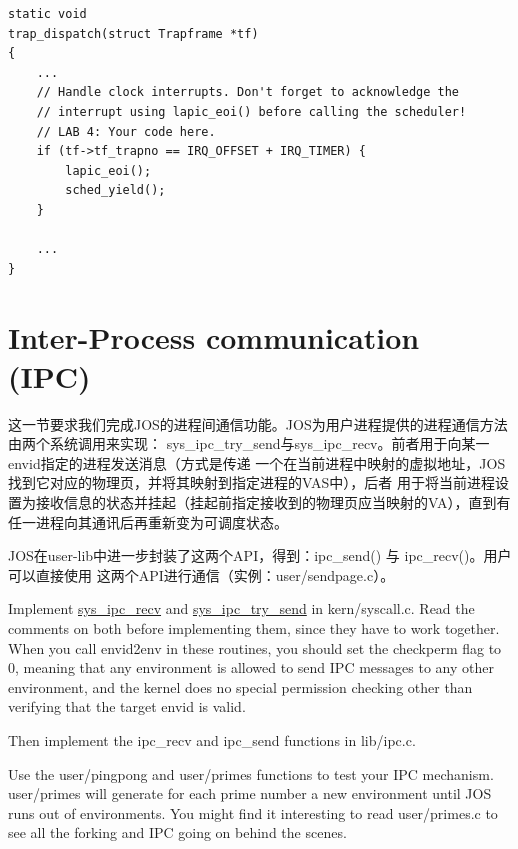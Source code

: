 \documentclass[12pt, letterpaper]{report}
\begin{document}
\lstset{style=CStyle}
\setmainfont{Consolas}
\begin{lstlisting}
static void
trap_dispatch(struct Trapframe *tf)
{
    ...
    // Handle clock interrupts. Don't forget to acknowledge the
    // interrupt using lapic_eoi() before calling the scheduler!
    // LAB 4: Your code here.
    if (tf->tf_trapno == IRQ_OFFSET + IRQ_TIMER) {
        lapic_eoi();
        sched_yield();
    }

    ...
}
\end{lstlisting}
\setmainfont{Times New Roman}

\section[\large Inter-Process communication (IPC)]{Inter-Process communication (IPC)}
这一节要求我们完成JOS的进程间通信功能。JOS为用户进程提供的进程通信方法由两个系统调用来实现：
sys\_ipc\_try\_send与sys\_ipc\_recv。前者用于向某一envid指定的进程发送消息（方式是传递
一个在当前进程中映射的虚拟地址，JOS找到它对应的物理页，并将其映射到指定进程的VAS中），后者
用于将当前进程设置为接收信息的状态并挂起（挂起前指定接收到的物理页应当映射的VA），直到有
任一进程向其通讯后再重新变为可调度状态。\par 
JOS在user-lib中进一步封装了这两个API，得到：ipc\_send() 与 ipc\_recv()。用户可以直接使用
这两个API进行通信（实例：user/sendpage.c）。\par 

\newpage


{
    \par 
    {
        Implement \underline{sys\_ipc\_recv} and \underline{sys\_ipc\_try\_send} in kern/syscall.c. 
        Read the comments on both before implementing them, 
        since they have to work together. 
        When you call envid2env in these routines, 
        you should set the checkperm flag to 0, 
        meaning that any environment is allowed to 
        send IPC messages to any other environment, 
        and the kernel does no special permission 
        checking other than verifying that the target envid is valid.
    }
    \par 
    {
        Then implement the ipc\_recv and ipc\_send functions in lib/ipc.c.
    }
    \par
    {
        Use the user/pingpong and user/primes functions to test your IPC mechanism. 
        user/primes will generate for each prime number a new environment 
        until JOS runs out of environments. 
        You might find it interesting to read user/primes.c 
        to see all the forking and IPC going on behind the scenes.
    }
    \par 
}
\end{document}

